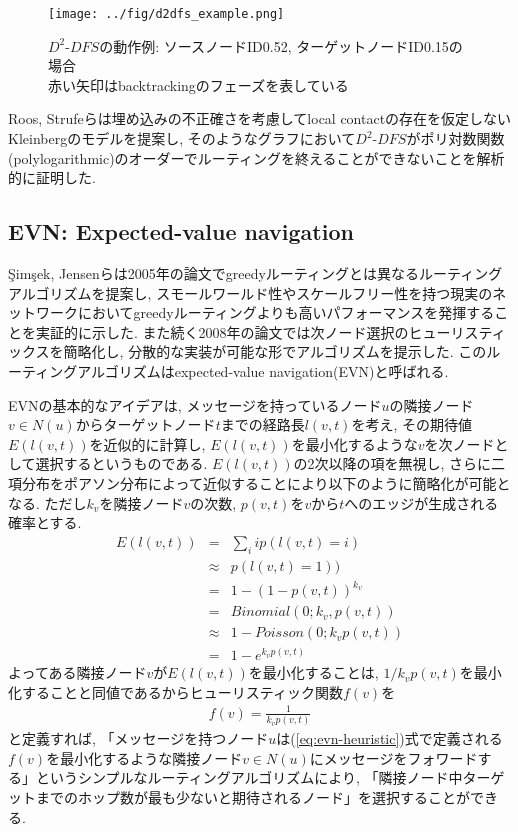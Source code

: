 \documentclass[dvipdfmx]{ampbt}
\begin{document}
   \begin{figure}[htbp]
    \centerline{\texttt{[image: ../fig/d2dfs\_example.png]}}
    \caption{$D^2$-$DFS$の動作例: ソースノードID0.52, ターゲットノードID0.15の場合 \\ 赤い矢印はbacktrackingのフェーズを表している}
    \label{fig:d2dfs_example}
   \end{figure}

   Roos, Strufeらは埋め込みの不正確さを考慮してlocal contactの存在を仮定しないKleinbergのモデルを提案し, そのようなグラフにおいて$D^2$-$DFS$がポリ対数関数(polylogarithmic)のオーダーでルーティングを終えることができないことを解析的に証明した\cite{roos2013contribution}. 

   \subsection{EVN: Expected-value navigation} \label{sec:evn}
   {\c{S}}im{\c{s}}ek, Jensenらは2005年の論文でgreedyルーティングとは異なるルーティングアルゴリズムを提案し, スモールワールド性やスケールフリー性を持つ現実のネットワークにおいてgreedyルーティングよりも高いパフォーマンスを発揮することを実証的に示した\cite{simsek2005decentralized}. また続く2008年の論文では次ノード選択のヒューリスティックスを簡略化し, 分散的な実装が可能な形でアルゴリズムを提示した\cite{simsek2008navigating}. このルーティングアルゴリズムはexpected-value navigation(EVN)と呼ばれる.

   EVNの基本的なアイデアは, メッセージを持っているノード$u$の隣接ノード$v \in N(u)$からターゲットノード$t$までの経路長$l(v,t)$を考え, その期待値$E(l(v,t))$を近似的に計算し, $E(l(v,t))$を最小化するような$v$を次ノードとして選択するというものである. $E(l(v,t))$の2次以降の項を無視し, さらに二項分布をポアソン分布によって近似することにより以下のように簡略化が可能となる. ただし$k_v$を隣接ノード$v$の次数, $p(v,t)$を$v$から$t$へのエッジが生成される確率とする.
    \begin{eqnarray}
     E(l(v,t)) &=& \sum_i ip(l(v,t)=i)\nonumber \\
     &\approx& p(l(v,t)=1)  )\nonumber\\
     &=& 1- (1 - p(v,t))^{k_v} \nonumber\\
     &=& Binomial(0;  k_v, p(v,t)) \nonumber \\
     &\approx& 1 - Poisson(0; k_vp(v,t)) \nonumber\\
     &=& 1- e^{k_vp(v,t)} \label{eq:evn-basic}
    \end{eqnarray}
    よってある隣接ノード$v$が$E(l(v,t))$を最小化することは, $1/k_vp(v,t)$を最小化することと同値であるからヒューリスティック関数$f(v)$を
    \begin{eqnarray}
     f(v) = \frac{1}{k_vp(v,t)}\label{eq:evn-heuristic}
    \end{eqnarray}
    と定義すれば, 「メッセージを持つノード$u$は(\ref{eq:evn-heuristic})式で定義される$f(v)$を最小化するような隣接ノード$v \in N(u)$にメッセージをフォワードする」というシンプルなルーティングアルゴリズムにより, 「隣接ノード中ターゲットまでのホップ数が最も少ないと期待されるノード」を選択することができる. 
\end{document}
